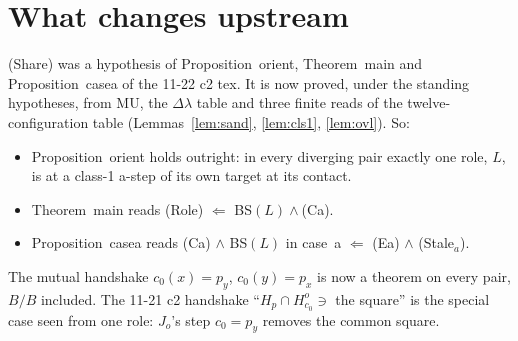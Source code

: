 \documentclass[11pt]{article}
\theoremstyle{definition}\newtheorem{definition}[theorem]{Definition}\newtheorem{remark}[theorem]{Remark}
\begin{document}
\section{What changes upstream}
(Share) was a hypothesis of Proposition~orient, Theorem~main and Proposition~casea of the 11-22 c2 tex. It is now proved, under the standing hypotheses, from MU, the $\Delta\lambda$ table and three finite reads of the twelve-configuration table (Lemmas~\ref{lem:sand}, \ref{lem:cls1}, \ref{lem:ovl}). So:
\begin{itemize}
\item Proposition~orient holds outright: in every diverging pair exactly one role, $L$, is at a class-1 a-step of its own target at its contact.
\item Theorem~main reads (Role) $\Leftarrow$ BS$(L)\wedge$(Ca).
\item Proposition~casea reads (Ca) $\wedge$ BS$(L)$ in case~a $\Leftarrow$ (Ea) $\wedge$ (Stale$_a$).
\end{itemize}
The mutual handshake $c_0(x)=p_y$, $c_0(y)=p_x$ is now a theorem on every pair, $B/B$ included. The 11-21 c2 handshake ``$H_p\cap H^o_{c_0}\ni$ the square'' is the special case seen from one role: $J_o$'s step $c_0=p_y$ removes the common square.
\end{document}
